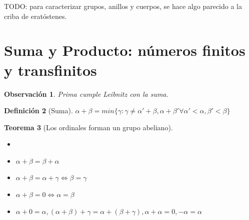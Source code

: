 \documentclass[10pt,a4paper,final]{report}
\newtheorem{theorem}{Teorema}
\newtheorem{definition}[theorem]{Definición}
\newtheorem{observation}[theorem]{Observación}
\begin{document}
TODO: para caracterizar grupos, anillos y cuerpos, se hace algo parecido a la criba de eratóstenes.

\section{Suma y Producto: números finitos y transfinitos}


\begin{observation}
	Prima cumple Leibnitz con la suma.
\end{observation}

\begin{definition}[Suma]
	$\alpha + \beta = min \{\gamma: \gamma \neq \alpha' + \beta, \alpha + \beta' \forall \alpha'<\alpha, \beta'<\beta \}$
\end{definition}

\begin{theorem}[Los ordinales forman un grupo abeliano]
	\begin{itemize}
		\item[]
		\item $\alpha + \beta = \beta + \alpha$
		\item $\alpha + \beta = \alpha + \gamma \Leftrightarrow \beta = \gamma$
		\item $\alpha + \beta = 0 \Leftrightarrow \alpha = \beta$
		\item $\alpha + 0 = \alpha, (\alpha + \beta) + \gamma = \alpha + (\beta + \gamma), \alpha + \alpha = 0, -\alpha = \alpha$
	\end{itemize}
\end{theorem}
\end{document}
